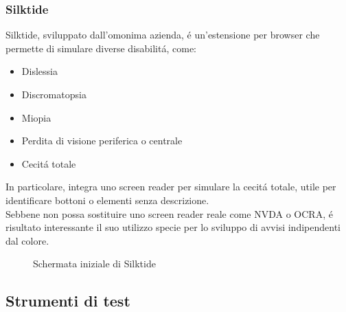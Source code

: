 \documentclass[]{article}
\begin{document}
\subsubsection*{Silktide}
Silktide, sviluppato dall'omonima azienda, é un'estensione per browser che permette di simulare diverse disabilitá, come:
\begin{itemize}
	\item Dislessia
	\item Discromatopsia
	\item Miopia
	\item Perdita di visione periferica o centrale
	\item Cecitá totale
\end{itemize}
In particolare, integra uno screen reader per simulare la cecitá totale, utile per identificare bottoni o elementi senza descrizione.\\
Sebbene non possa sostituire uno screen reader reale come NVDA o OCRA, é risultato interessante il suo utilizzo specie per lo sviluppo di avvisi indipendenti dal colore.
\begin{figure}[H]
	\centering
	\caption{Schermata iniziale di Silktide}
\end{figure}
\subsection{Strumenti di test}
\end{document}
